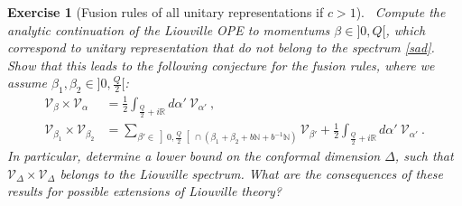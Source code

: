 \documentclass[12pt, a4paper, notitlepage, twoside]{report}
\numberwithin{equation}{section}
\theoremstyle{break}
\newtheorem{exo}{Exercise}[chapter]
\begin{document}
\begin{exo}[Fusion rules of all unitary representations if $c>1$]
 ~\label{exoaur}
Compute the analytic continuation of the Liouville OPE to momentums $\beta\in ]0,Q[$, which correspond to unitary representation that do not belong to the spectrum \eqref{sad}. 
Show that this leads to the following conjecture for the fusion rules, where we assume $\beta_1,\beta_2\in ]0,\frac{Q}{2}[$:
\begin{align}
 \mathcal{V}_\beta \times \mathcal{V}_\alpha  
&= \frac12 \int_{\frac{Q}{2}+i\mathbb{R}} d\alpha'\ \mathcal{V}_{\alpha'}\ ,
\\
 \mathcal{V}_{\beta_1} \times \mathcal{V}_{\beta_2} 
&= \sum_{\beta'\in \left]0,\frac{Q}{2}\right[\cap \left(\beta_1+\beta_2 + b\mathbb{N}+b^{-1}\mathbb{N}\right)} \mathcal{V}_{\beta'}  
+ \frac12 \int_{\frac{Q}{2}+i\mathbb{R}} d\alpha'\ \mathcal{V}_{\alpha'}\ .
\end{align}
In particular, determine a lower bound on the conformal dimension $\Delta$, such that $\mathcal{V}_\Delta \times \mathcal{V}_\Delta$ belongs to the Liouville spectrum.
What are the consequences of these results for possible extensions of Liouville theory?
\end{exo}
\end{document}
